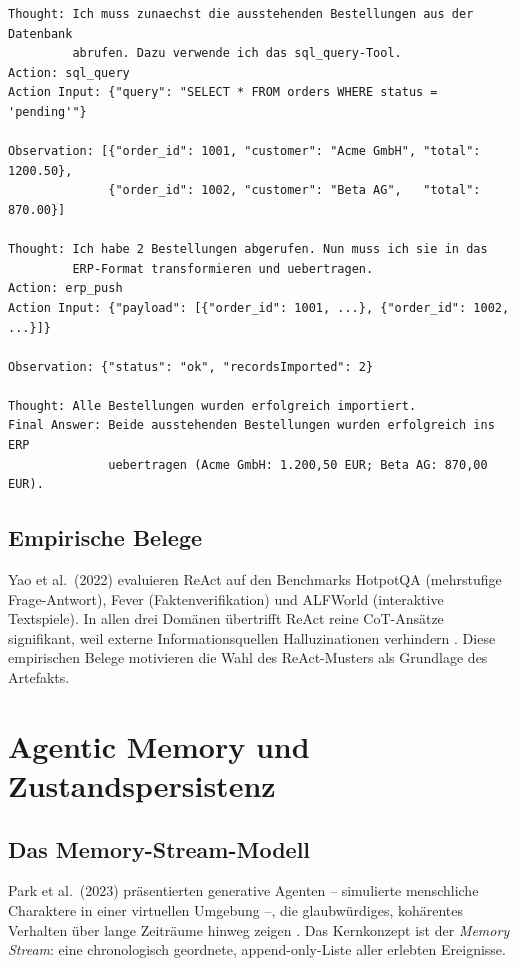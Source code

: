 \documentclass[12pt,a4paper,oneside]{report}
\begin{document}
\begin{lstlisting}[caption={ReAct-Trajekt für das SC-01-Szenario (eigene Darstellung)},
  label=lst:react-example]
Thought: Ich muss zunaechst die ausstehenden Bestellungen aus der Datenbank
         abrufen. Dazu verwende ich das sql_query-Tool.
Action: sql_query
Action Input: {"query": "SELECT * FROM orders WHERE status = 'pending'"}

Observation: [{"order_id": 1001, "customer": "Acme GmbH", "total": 1200.50},
              {"order_id": 1002, "customer": "Beta AG",   "total":  870.00}]

Thought: Ich habe 2 Bestellungen abgerufen. Nun muss ich sie in das
         ERP-Format transformieren und uebertragen.
Action: erp_push
Action Input: {"payload": [{"order_id": 1001, ...}, {"order_id": 1002, ...}]}

Observation: {"status": "ok", "recordsImported": 2}

Thought: Alle Bestellungen wurden erfolgreich importiert.
Final Answer: Beide ausstehenden Bestellungen wurden erfolgreich ins ERP
              uebertragen (Acme GmbH: 1.200,50 EUR; Beta AG: 870,00 EUR).
\end{lstlisting}

\subsection{Empirische Belege}

Yao et al.\ (2022) evaluieren ReAct auf den Benchmarks HotpotQA (mehrstufige
Frage-Antwort), Fever (Faktenverifikation) und ALFWorld (interaktive Textspiele).
In allen drei Domänen übertrifft ReAct reine \ac{CoT}-Ansätze signifikant, weil
externe Informationsquellen Halluzinationen verhindern \cite{yao2022react}. Diese
empirischen Belege motivieren die Wahl des ReAct-Musters als Grundlage des Artefakts.

\section{Agentic Memory und Zustandspersistenz}
\label{sec:memory}

\subsection{Das Memory-Stream-Modell}

Park et al.\ (2023) präsentierten generative Agenten -- simulierte menschliche
Charaktere in einer virtuellen Umgebung --, die glaubwürdiges, kohärentes Verhalten
über lange Zeiträume hinweg zeigen \cite{park2023generative}. Das Kernkonzept ist der
\textit{Memory Stream}: eine chronologisch geordnete, append-only-Liste aller erlebten
Ereignisse.
\end{document}
